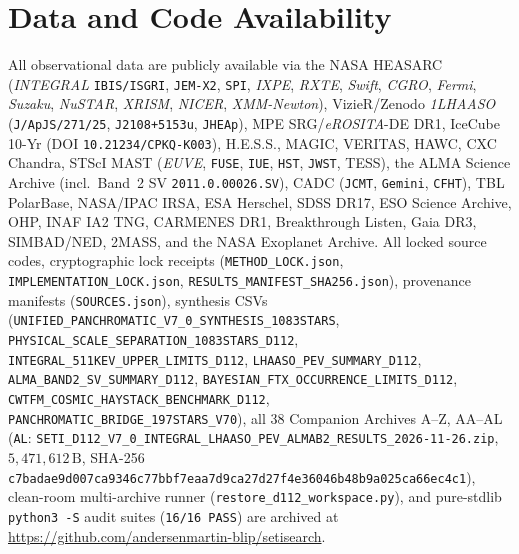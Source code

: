 \documentclass[twocolumn,10pt]{article}
\begin{document}
\section*{Data and Code Availability}
All observational data are publicly available via the NASA HEASARC (\textit{INTEGRAL} \texttt{IBIS/ISGRI}, \texttt{JEM-X2}, \texttt{SPI}, \textit{IXPE}, \textit{RXTE}, \textit{Swift}, \textit{CGRO}, \textit{Fermi}, \textit{Suzaku}, \textit{NuSTAR}, \textit{XRISM}, \textit{NICER}, \textit{XMM-Newton}), VizieR/Zenodo \textit{1LHAASO} (\texttt{J/ApJS/271/25}, \texttt{J2108+5153u}, \texttt{JHEAp}), MPE SRG/\textit{eROSITA}-DE DR1, IceCube 10-Yr (DOI \texttt{10.21234/CPKQ-K003}), H.E.S.S., MAGIC, VERITAS, HAWC, CXC Chandra, STScI MAST (\textit{EUVE}, \texttt{FUSE}, \texttt{IUE}, \texttt{HST}, \texttt{JWST}, TESS), the ALMA Science Archive (incl.\ Band~2 SV \texttt{2011.0.00026.SV}), CADC (\texttt{JCMT}, \texttt{Gemini}, \texttt{CFHT}), TBL PolarBase, NASA/IPAC IRSA, ESA Herschel, SDSS DR17, ESO Science Archive, OHP, INAF IA2 TNG, CARMENES DR1, Breakthrough Listen, Gaia DR3, SIMBAD/NED, 2MASS, and the NASA Exoplanet Archive. All locked source codes, cryptographic lock receipts (\texttt{METHOD\_LOCK.json}, \texttt{IMPLEMENTATION\_\allowbreak LOCK.json}, \texttt{RESULTS\_\allowbreak MANIFEST\_\allowbreak SHA256.json}), provenance manifests (\texttt{SOURCES.json}), synthesis CSVs (\texttt{UNIFIED\_\allowbreak PANCHROMATIC\_\allowbreak V7\_0\_\allowbreak SYNTHESIS\_\allowbreak 1083STARS}, \texttt{PHYSICAL\_\allowbreak SCALE\_\allowbreak SEPARATION\_\allowbreak 1083STARS\_\allowbreak D112}, \texttt{INTEGRAL\_\allowbreak 511KEV\_\allowbreak UPPER\_\allowbreak LIMITS\_\allowbreak D112}, \texttt{LHAASO\_\allowbreak PEV\_\allowbreak SUMMARY\_\allowbreak D112}, \texttt{ALMA\_\allowbreak BAND2\_\allowbreak SV\_\allowbreak SUMMARY\_\allowbreak D112}, \texttt{BAYESIAN\_\allowbreak FTX\_\allowbreak OCCURRENCE\_\allowbreak LIMITS\_\allowbreak D112}, \texttt{CWTFM\_\allowbreak COSMIC\_\allowbreak HAYSTACK\_\allowbreak BENCHMARK\_\allowbreak D112}, \texttt{PANCHROMATIC\_\allowbreak BRIDGE\_\allowbreak 197STARS\_\allowbreak V70}), all 38 Companion Archives A--Z, AA--AL (\texttt{AL}: \texttt{SETI\_D112\_\allowbreak V7\_0\_\allowbreak INTEGRAL\_\allowbreak LHAASO\_\allowbreak PEV\_\allowbreak ALMAB2\_RESULTS\_2026-11-26.zip}, $5{,}471{,}612\,\text{B}$, SHA-256 \texttt{c7badae9\allowbreak d007ca93\allowbreak 46c77bbf\allowbreak 7eaa7d9c\allowbreak a27d27f4\allowbreak e36046b4\allowbreak 8b9a025c\allowbreak a66ec4c1}), clean-room multi-archive runner (\texttt{restore\_d112\_workspace.py}), and pure-stdlib \texttt{python3 -S} audit suites (\texttt{16/16 PASS}) are archived at \url{https://github.com/andersenmartin-blip/setisearch}.
\end{document}
